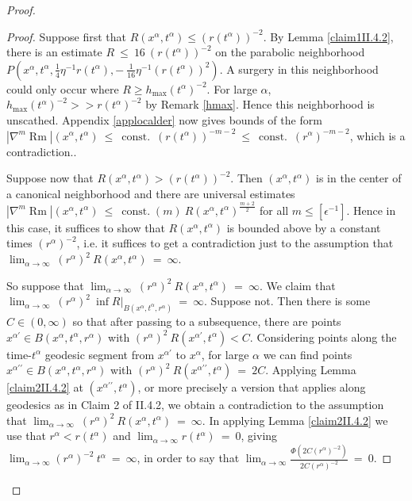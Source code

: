 \documentclass[12pt]{amsart}
\newcommand{\al}{\alpha}
\newcommand{\const}{\operatorname{const.}}
\newcommand{\Rm}{\operatorname{Rm}}
\numberwithin{equation}{section}
\theoremstyle{plain}
\theoremstyle{definition}
\theoremstyle{remark}
\begin{document}
\begin{proof}
\begin{proof}
Suppose first that 
$R(x^\al, t^\al) \le \left( r(t^\al) \right)^{-2}$.
By Lemma \ref{claim1II.4.2}, there is an estimate
$R \: \le \: 16 \: \left( r(t^\al) \right)^{-2}$ on the parabolic neighborhood
$P \left( x^\al, t^\al, \frac14 \eta^{-1} r(t^\al),
- \: \frac{1}{16} \eta^{-1} \left( r(t^\al) \right)^2 \right)$. 
A surgery in this neighborhood could only occur where 
$R \ge h_{\max}(t^\al)^{-2}$. For large $\al$,
$h_{\max}(t^\al)^{-2} >> r(t^\al)^{-2}$ by Remark \ref{hmax}. 
Hence this neighborhood is unscathed.
Appendix \ref{applocalder} now gives bounds of the form
$|\nabla^m \Rm|(x^\al, t^\al) \: \le \: \const \: 
\left( r(t^\al) \right)^{-m-2} \: \le \: \const \:
(r^\al)^{-m-2}$, which is a contradiction..

Suppose now that $R(x^\al, t^\al) > \left( r(t^\al) \right)^{-2}$.
Then $(x^\al, t^\al)$ is in the center of a canonical neighborhood and there
are universal estimates $|\nabla^m \Rm|(x^\al, t^\al) \: \le \: \const(m) \: 
R(x^\al, t^\al)^{\frac{m+2}{2}}$ for all $m \le [\epsilon^{-1}]$. Hence
in this case, it suffices to show that $R(x^\al, t^\al)$ is bounded above by
a constant times $(r^\al)^{-2}$, i.e. it suffices to get a contradiction 
just to the assumption that
$\lim_{\al \rightarrow \infty} \:
(r^\al)^{2} \: R(x^\al, t^\al) \: = \: \infty$.

So suppose that $\lim_{\al \rightarrow \infty} \:
(r^\al)^{2} \: R(x^\al, t^\al) \: = \: \infty$.
We claim that $\lim_{\al \rightarrow \infty} \: 
(r^\al)^{2} \: \inf R \Big|_{B \left( x^\al, t^\al,
r^\al \right)} \: = \: \infty$. 
Suppose not.  Then there is some $C \in (0, \infty)$ so that
after passing to a subsequence, there are points
$x^{\al \prime} \in B \left( x^\al, t^\al, r^\al
 \right)$ with
$(r^\al)^{2} \: R(x^{\al \prime}, t^\al) < C$. Considering points
along the time-$t^\al$ geodesic segment from
$x^{\al \prime}$ to $x^\al$,
for large $\al$ we can find points 
$x^{\al \prime \prime} \in B \left( x^\al, t^\al,
r^\al \right)$ with
$(r^\al)^{2} \: R(x^{\al \prime\prime}, t^\al) \: = \: 2C$.
Applying Lemma \ref{claim2II.4.2} at $(x^{\al \prime \prime}, t^\al)$,
or more precisely a version that applies along geodesics as in
Claim 2 of II.4.2, we obtain a contradiction to the assumption
that $\lim_{\al \rightarrow \infty} \:
(r^\al)^{2} \: R(x^\al, t^\al) \: = \: \infty$. In applying
Lemma \ref{claim2II.4.2} we use that
$r^\al < r(t^\al)$ and $\lim_{\al \rightarrow \infty} r(t^\al) \: = \: 0$,
giving
$\lim_{\al \rightarrow \infty} \left( r^\al \right)^{-2} \: t^\al \: = \:
\infty$, in order to say that
$\lim_{\al \rightarrow \infty} 
\frac{\Phi \left( 2C (r^\al)^{-2} \right)}{ 2C (r^\al)^{-2}} \: = \: 0$.


\end{proof}
\end{proof}
\end{document}
